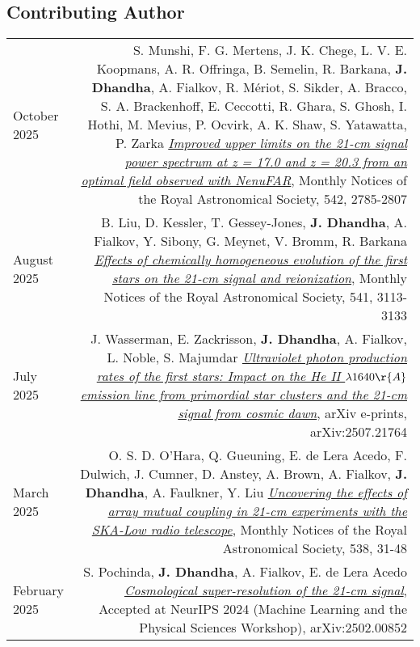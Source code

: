 \documentclass{article}
\begin{document}
\subsection*{Contributing Author}

\begin{longtable}{L!{\vrule}R}
    October 2025 &
    S. Munshi, F. G. Mertens, J. K. Chege, L. V. E. Koopmans, A. R. Offringa, B. Semelin, R. Barkana, \textbf{J. Dhandha}, A. Fialkov, R. M\'eriot, S. Sikder, A. Bracco, S. A. Brackenhoff, E. Ceccotti, R. Ghara, S. Ghosh, I. Hothi, M. Mevius, P. Ocvirk, A. K. Shaw, S. Yatawatta, P. Zarka
    \href{https://ui.adsabs.harvard.edu/abs/2025MNRAS.542.2785M}{\textit{Improved upper limits on the 21-cm signal power spectrum at z = 17.0 and z = 20.3 from an optimal field observed with NenuFAR}},
    Monthly Notices of the Royal Astronomical Society, 542, 2785-2807 \\

    August 2025 &
    B. Liu, D. Kessler, T. Gessey-Jones, \textbf{J. Dhandha}, A. Fialkov, Y. Sibony, G. Meynet, V. Bromm, R. Barkana
    \href{https://ui.adsabs.harvard.edu/abs/2025MNRAS.541.3113L}{\textit{Effects of chemically homogeneous evolution of the first stars on the 21-cm signal and reionization}},
    Monthly Notices of the Royal Astronomical Society, 541, 3113-3133 \\

    July 2025 &
    J. Wasserman, E. Zackrisson, \textbf{J. Dhandha}, A. Fialkov, L. Noble, S. Majumdar
    \href{https://ui.adsabs.harvard.edu/abs/2025arXiv250721764W}{\textit{Ultraviolet photon production rates of the first stars: Impact on the He II $\lambda 1640 \r{A}$ emission line from primordial star clusters and the 21-cm signal from cosmic dawn}},
    arXiv e-prints, arXiv:2507.21764 \\

    March 2025 &
    O. S. D. O'Hara, Q. Gueuning, E. de Lera Acedo, F. Dulwich, J. Cumner, D. Anstey, A. Brown, A. Fialkov, \textbf{J. Dhandha}, A. Faulkner, Y. Liu
    \href{https://ui.adsabs.harvard.edu/abs/2025MNRAS.538...31O}{\textit{Uncovering the effects of array mutual coupling in 21-cm experiments with the SKA-Low radio telescope}},
    Monthly Notices of the Royal Astronomical Society, 538, 31-48 \\

    February 2025 &
    S. Pochinda, \textbf{J. Dhandha}, A. Fialkov, E. de Lera Acedo
    \href{https://ui.adsabs.harvard.edu/abs/2025arXiv250200852P}{\textit{Cosmological super-resolution of the 21-cm signal}},
    Accepted at NeurIPS 2024 (Machine Learning and the Physical Sciences Workshop), arXiv:2502.00852 \\


\end{longtable}
\end{document}
